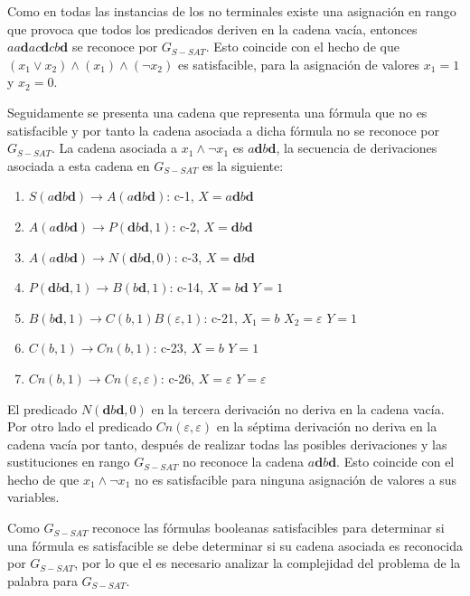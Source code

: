 Como en todas las instancias de los no terminales existe una asignación en rango que provoca que todos los
predicados deriven en la cadena vacía, entonces $aa\mathbf{d}ac\mathbf{d}cb\mathbf{d}$ se reconoce por $G_{S-SAT}$. Esto coincide con el hecho de que $(x_1 \vee x_2) \wedge (x_1) \wedge (\neg x_2)$ es satisfacible, para la asignación de valores $x_1=1$ y $x_2=0$.

Seguidamente se presenta una cadena que representa una fórmula que no es satisfacible y por tanto la cadena asociada
a dicha fórmula no se reconoce por $G_{S-SAT}$. La cadena asociada a $x_1 \wedge \neg x_1$ es $a\mathbf{d}b\mathbf{d}$,
la secuencia de derivaciones asociada a esta cadena en $G_{S-SAT}$ es la siguiente:

\begin{enumerate}
    \item $S(a\mathbf{d}b\mathbf{d})\to A(a\mathbf{d}b\mathbf{d})$: c-1, $X=a\mathbf{d}b\mathbf{d}$
    \item $A(a\mathbf{d}b\mathbf{d})\to P(\mathbf{d}b\mathbf{d},1)$: c-2, $X=\mathbf{d}b\mathbf{d}$
    \item $A(a\mathbf{d}b\mathbf{d})\to N(\mathbf{d}b\mathbf{d},0)$: c-3, $X=\mathbf{d}b\mathbf{d}$
    \item $P(\mathbf{d}b\mathbf{d},1) \to B(b\mathbf{d},1)$: c-14, $X=b\mathbf{d}$ $Y=1$
    \item $B(b\mathbf{d},1)\to C(b,1) B(\varepsilon,1)$: c-21, $X_1=b$ $X_2=\varepsilon$ $Y=1$
    \item $C(b,1)\to Cn(b,1)$: c-23, $X=b$ $Y=1$
    \item $Cn(b,1)\to Cn(\varepsilon,\varepsilon)$: c-26, $X=\varepsilon$ $Y=\varepsilon$
\end{enumerate}


El predicado $N(\mathbf{d}b\mathbf{d},0)$ en la tercera derivación no deriva en la cadena vacía. Por otro lado
el predicado $Cn(\varepsilon,\varepsilon)$ en la séptima derivación no deriva en la cadena vacía por tanto,
después de realizar todas las posibles derivaciones y las sustituciones en rango $G_{S-SAT}$ no reconoce la cadena $a\mathbf{d}b\mathbf{d}$.  Esto coincide con el hecho de que $x_1 \wedge \neg x_1$ no es satisfacible para ninguna asignación de valores a sus variables.

Como $G_{S-SAT}$ reconoce las fórmulas booleanas satisfacibles para determinar si una fórmula es satisfacible se debe determinar si su cadena asociada es reconocida por $G_{S-SAT}$, por lo que el es necesario analizar la complejidad del problema
de la palabra para $G_{S-SAT}$.

